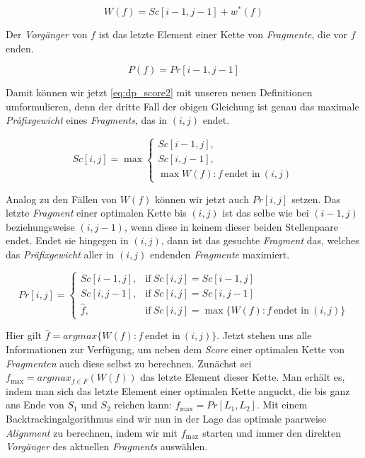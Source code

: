 \begin{equation}\label{eq:praefixgewicht}
	W(f) = Sc[i\!-\!1,j\!-\!1]+w^*(f)
\end{equation}

Der \emph{Vorgänger} von $f$ ist das letzte Element einer Kette von \emph{Fragmente}, die vor $f$ enden.

\begin{equation}\label{eq:vorgaenger}
	P(f) = Pr[i\!-\!1,j\!-\!1]
\end{equation}

Damit können wir jetzt \eqref{eq:dp_score2} mit unseren neuen Definitionen umformulieren, denn der dritte Fall der obigen Gleichung ist genau das maximale \emph{Präfixgewicht} eines \emph{Fragments}, das in $(i,j)$ endet.

\begin{equation}\label{eq:praefixgewicht2}
	Sc[i,j] = \max
		\begin{cases}
		Sc[i\!-\!1,j], \\
		Sc[i,j\!-\!1], \\
		\max{W(f): f\: \text{endet in}\: (i,j)}
	\end{cases}	
\end{equation}

Analog zu den Fällen von $W(f)$ können wir jetzt auch $Pr[i,j]$ setzen. Das letzte \emph{Fragment} einer optimalen Kette bis $(i,j)$ ist das selbe wie bei $(i-1,j)$ beziehungsweise $(i,j-1)$, wenn diese in keinem dieser beiden Stellenpaare endet. Endet sie hingegen in $(i,j)$, dann ist das gesuchte \emph{Fragment} das, welches das \emph{Präfixgewicht} aller in $(i,j)$ endenden \emph{Fragmente} maximiert.

\begin{equation}\label{eq:vorgaenger2}
	Pr[i,j] =
		\begin{cases}
			Sc[i-1,j], & \text{if}\: Sc[i,j] = Sc[i\!-\!1,j]\\
			Sc[i,j-1], & \text{if}\: Sc[i,j] = Sc[i,j\!-\!1]\\
			\hat{f},   & \text{if}\: Sc[i,j] = \max{\{W(f) : f\: \text{endet in}\: (i,j)\}}
		\end{cases}	
\end{equation}

Hier gilt $\hat{f} = argmax\{W(f) : f\: \text{endet in}\: (i,j) \}$. Jetzt stehen uns alle Informationen zur Verfügung, um neben dem \emph{Score} einer optimalen Kette von \emph{Fragmenten} auch diese selbst zu berechnen. Zunächst sei $f_{\max} = argmax_{f\in F}(W(f))$ das letzte Element dieser Kette. Man erhält es, indem man sich das letzte Element einer optimalen Kette anguckt, die bis ganz ans Ende von $S_1$ und $S_2$ reichen kann: $f_{\max} = Pr[L_1,L_2]$. Mit einem Backtrackingalgorithmus sind wir nun in der Lage das optimale paarweise \emph{Alignment} zu berechnen, indem wir mit $f_{\max}$ starten und immer den direkten \emph{Vorgänger} des aktuellen \emph{Fragments} auswählen.


